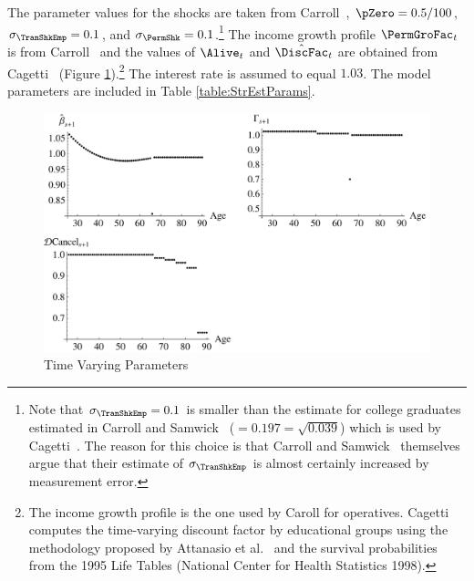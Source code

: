 \documentclass[titlepage, headings=optiontotocandhead]{\econtex}
\begin{document}
The parameter values for the shocks are taken from Carroll~\citeyearpar{carroll:brookings}, $\pZero=0.5/100$, $\sigma _{\TranShkEmp }=0.1$, and $\sigma_{\PermShk}=0.1$.\footnote{Note that $\sigma _{\TranShkEmp}=0.1$ is smaller than the estimate for college graduates estimated in
  Carroll and Samwick~\citeyearpar{carroll&samwick:nature} ($=0.197=\sqrt{0.039}$) which is used by Cagetti~\citeyearpar{cagettiWprofiles}. The reason for this choice is that Carroll and Samwick~\citeyearpar{carroll&samwick:nature} themselves argue that their estimate of $\sigma_{\TranShkEmp }$ is almost certainly increased by measurement error.} The income growth profile $\PermGroFac_{t}$ is from Carroll~\citeyearpar{carrollBSLCPIH} and the values of $\Alive_{t}$ and $\byage{\DiscFac}_{t}$ are obtained from Cagetti~\citeyearpar{cagettiWprofiles} (Figure \ref{fig:TimeVaryingParam}).\footnote{The income growth profile is the one used by Caroll for operatives. Cagetti computes the time-varying discount factor by educational groups using the methodology proposed by Attanasio et al.~\citeyearpar{AttanasioBanksMeghirWeber} and the survival probabilities from the 1995 Life Tables (National Center for Health Statistics 1998).} The interest rate is assumed to equal $1.03$. The model parameters are included in Table \ref{table:StrEstParams}.

\hypertarget{PlotTimeVaryingParam}{}
\begin{figure}[h]
  \includegraphics{./Figures/PlotTimeVaryingParam}
  \caption{Time Varying Parameters}
  \label{fig:TimeVaryingParam}
\end{figure}
\end{document}
